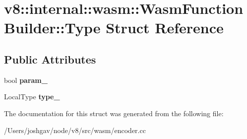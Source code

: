 \hypertarget{structv8_1_1internal_1_1wasm_1_1_wasm_function_builder_1_1_type}{}\section{v8\+:\+:internal\+:\+:wasm\+:\+:Wasm\+Function\+Builder\+:\+:Type Struct Reference}
\label{structv8_1_1internal_1_1wasm_1_1_wasm_function_builder_1_1_type}
\subsection*{Public Attributes}
\begin{DoxyCompactItemize}
\item 
bool {\bfseries param\+\_\+}\hypertarget{structv8_1_1internal_1_1wasm_1_1_wasm_function_builder_1_1_type_a6c00afaa3c2ad86a6cdef604825edcbe}{}\label{structv8_1_1internal_1_1wasm_1_1_wasm_function_builder_1_1_type_a6c00afaa3c2ad86a6cdef604825edcbe}

\item 
Local\+Type {\bfseries type\+\_\+}\hypertarget{structv8_1_1internal_1_1wasm_1_1_wasm_function_builder_1_1_type_a3590713d487b0d824f6d8c6041bf443d}{}\label{structv8_1_1internal_1_1wasm_1_1_wasm_function_builder_1_1_type_a3590713d487b0d824f6d8c6041bf443d}

\end{DoxyCompactItemize}


The documentation for this struct was generated from the following file\+:\begin{DoxyCompactItemize}
\item 
/\+Users/joshgav/node/v8/src/wasm/encoder.\+cc\end{DoxyCompactItemize}
